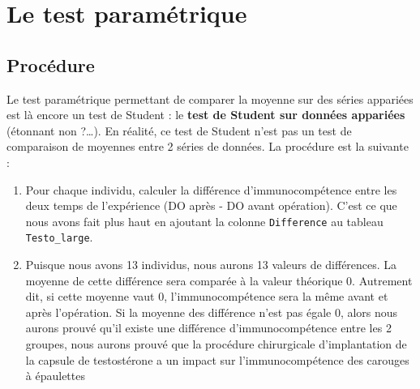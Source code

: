\documentclass[
  a4paper,
  DIV=11,
  numbers=noendperiod,
  oneside]{scrreprt}
\providecommand{\tightlist}{%
  \setlength{\itemsep}{0pt}\setlength{\parskip}{0pt}}\usepackage{longtable,booktabs,array}
\begin{document}
\hypertarget{le-test-paramuxe9trique-1}{%
\section{Le test paramétrique}\label{le-test-paramuxe9trique-1}}

\hypertarget{procuxe9dure}{%
\subsection{Procédure}\label{procuxe9dure}}

Le test paramétrique permettant de comparer la moyenne sur des séries
appariées est là encore un test de Student : le \textbf{test de Student
sur données appariées} (étonnant non ?\ldots). En réalité, ce test de
Student n'est pas un test de comparaison de moyennes entre 2 séries de
données. La procédure est la suivante :

\begin{enumerate}
\def\labelenumi{\arabic{enumi}.}
\tightlist
\item
  Pour chaque individu, calculer la différence d'immunocompétence entre
  les deux temps de l'expérience (DO après - DO avant opération). C'est
  ce que nous avons fait plus haut en ajoutant la colonne
  \texttt{Difference} au tableau \texttt{Testo\_large}.
\item
  Puisque nous avons 13 individus, nous aurons 13 valeurs de
  différences. La moyenne de cette différence sera comparée à la valeur
  théorique 0. Autrement dit, si cette moyenne vaut 0,
  l'immunocompétence sera la même avant et après l'opération. Si la
  moyenne des différence n'est pas égale 0, alors nous aurons prouvé
  qu'il existe une différence d'immunocompétence entre les 2 groupes,
  nous aurons prouvé que la procédure chirurgicale d'implantation de la
  capsule de testostérone a un impact sur l'immunocompétence des
  carouges à épaulettes
\end{enumerate}
\end{document}
